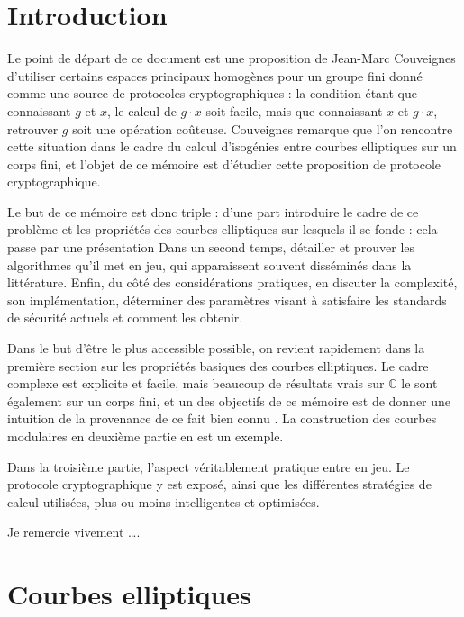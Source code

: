 \documentclass[11pt,a4paper]{article}
\newcommand{\C}{\mathbb{C}}
\theoremstyle{definition}
\begin{document}
\section{Introduction}

Le point de départ de ce document est une proposition de Jean-Marc Couveignes \cite{Couv} d'utiliser certains espaces principaux homogènes pour un groupe fini donné comme une source de protocoles cryptographiques : la condition étant que connaissant $g$ et $x$, le calcul de $g\cdot x$ soit facile, mais que connaissant $x$ et $g\cdot x$, retrouver $g$ soit une opération coûteuse. Couveignes remarque que l'on rencontre cette situation dans le cadre du calcul d'isogénies entre courbes elliptiques sur un corps fini, et l'objet de ce mémoire est d'étudier cette proposition de protocole cryptographique.

Le but de ce mémoire est donc triple : d'une part introduire le cadre de ce problème et les propriétés des courbes elliptiques sur lesquels il se fonde : cela passe par une présentation  Dans un second temps, détailler et prouver les algorithmes qu'il met en jeu, qui apparaissent souvent disséminés dans la littérature. Enfin, du côté des considérations pratiques, en discuter la complexité, son implémentation, déterminer des paramètres visant à satisfaire les standards de sécurité actuels et comment les obtenir.

Dans le but d'être le plus accessible possible, on revient rapidement dans la première section sur les propriétés basiques des courbes elliptiques. Le cadre complexe est explicite et facile, mais beaucoup de résultats vrais sur $\C$ le sont également sur un corps fini, et un des objectifs de ce mémoire est de donner une intuition de la provenance de ce fait \og bien connu \fg. La construction des courbes modulaires en deuxième partie en est un exemple.

Dans la troisième partie, l'aspect véritablement pratique entre en jeu. Le protocole cryptographique y est exposé, ainsi que les différentes stratégies de calcul utilisées, plus ou moins intelligentes et optimisées. 

Je remercie vivement \ldots.

\newpage

\tableofcontents

\newpage

\section{Courbes elliptiques}
\end{document}
